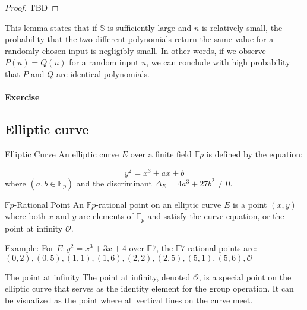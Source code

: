 \documentclass{article}
\begin{document}
\begin{proof}
    TBD
\end{proof}

This lemma states that if $\mathbb{S}$ is sufficiently large and $n$ is relatively small, the probability that the two different polynomials return the same value for a randomly chosen input is negligibly small. In other words, if we observe $P(u) = Q(u)$ for a random input $u$, we can conclude with high probability that $P$ and $Q$ are identical polynomials.

\paragraph{Exercise}

\subsection{Elliptic curve}

\begin{definition}{Elliptic Curve}{}
    An elliptic curve $E$ over a finite field $\mathbb{F}{p}$ is defined by the equation:

    \begin{equation}
        y^2 = x^3 + a x + b
    \end{equation}
    where $(a, b \in \mathbb{F}_{p})$ and the discriminant $\Delta_{E} = 4a^3 + 27b^2 \neq 0$.
\end{definition}

\begin{definition}{$\mathbb{F}{p}$-Rational Point}{}
An $\mathbb{F}{p}$-rational point on an elliptic curve $E$ is a point $(x, y)$ where both $x$ and $y$ are elements of $\mathbb{F}_{p}$ and satisfy the curve equation, or the point at infinity $\mathcal{O}$.
\end{definition}

Example: For $E: y^2 = x^3 + 3x + 4$ over $\mathbb{F}{7}$, the $\mathbb{F}{7}$-rational points are:
${(0, 2), (0, 5), (1, 1), (1, 6), (2, 2), (2, 5), (5, 1), (5, 6), \mathcal{O}}$

\begin{definition}{The point at infinity}{}
The point at infinity, denoted $\mathcal{O}$, is a special point on the elliptic curve that serves as the identity element for the group operation. It can be visualized as the point where all vertical lines on the curve meet.
\end{definition}
\end{document}
